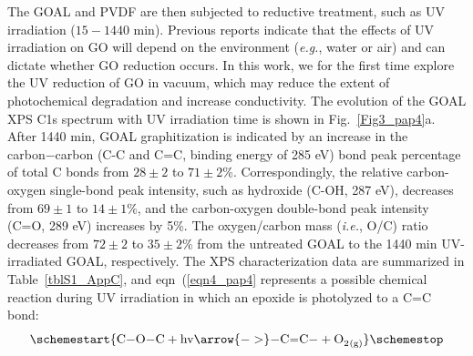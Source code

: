 The GOAL and PVDF are then subjected to reductive treatment, such as UV irradiation ($15-1440$ min). Previous reports indicate that the effects of UV irradiation\cite{gengler2013revealing,xing2014uv,guo2009green} on GO will depend on the environment (\textit{e.g.}, water or air) and can dictate whether GO reduction occurs.\cite{li2014tuning} In this work, we for the first time explore the UV reduction of GO in vacuum, which may reduce the extent of photochemical degradation and increase conductivity.\cite{hou2015photochemical} The evolution of the GOAL XPS C1s spectrum with UV irradiation time is shown in Fig.~\ref{Fig3_pap4}a. After 1440 min, GOAL graphitization is indicated by an increase in the carbon−carbon (C-C and C=C, binding energy of 285 eV) bond peak percentage of total C bonds from $28\pm2$ to $71\pm2$\%. Correspondingly, the relative carbon-oxygen single-bond peak intensity, such as hydroxide (C-OH, 287 eV), decreases from $69\pm1$ to $14\pm1$\%, and the carbon-oxygen double-bond peak intensity (C=O, 289 eV) increases by 5\%. The oxygen/carbon mass (\textit{i.e.}, O/C) ratio decreases from $72\pm2$ to $35\pm2$\% from the untreated GOAL to the 1440 min UV-irradiated GOAL, respectively. The XPS characterization data are summarized in Table~\ref{tblS1_AppC}, and eqn~(\ref{eqn4_pap4} represents a possible chemical reaction during UV irradiation in which an epoxide is photolyzed to a C=C bond:
\begin{equation}
\schemestart
  {\ce{C-O-C} + \ce{hv} \arrow{->}\ce{-C=C-} + \ce{O2_{(g)}}} 
\schemestop
 \label{eqn4_pap4}
\end{equation}
